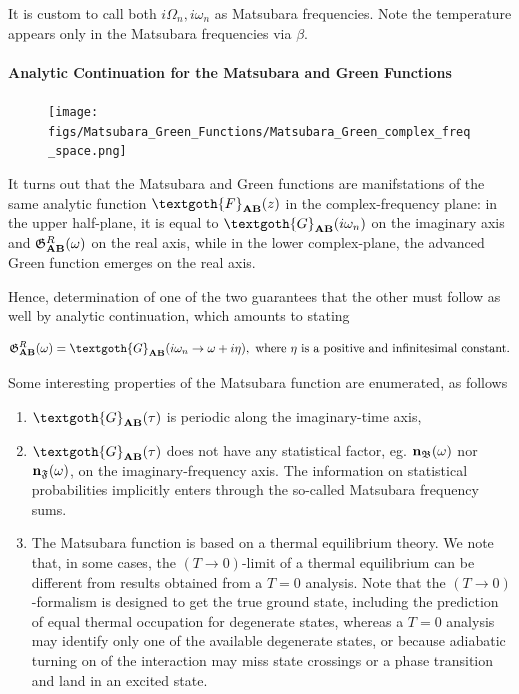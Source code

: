 It is custom to call both $i\Omega_n, i\omega_n$ as Matsubara frequencies. Note the temperature appears only in the Matsubara frequencies via $\beta$. \\

\paragraph{Analytic Continuation for the Matsubara and Green Functions}

\begin{figure}
\texttt{[image: figs/Matsubara\_Green\_Functions/Matsubara\_Green\_complex\_freq\_space.png]}
\end{figure} 

It turns out that the Matsubara and Green functions are manifstations of the same analytic function $\textgoth{F}_{{\bf AB}}(z)$ in the complex-frequency plane: in the upper half-plane, it is equal to ${\textgoth{G}_{{\bf AB}}}(i\omega_n)$ on the imaginary axis and $\mathfrak{G}^{R}_{{\bf AB}}(\omega)$ on the real axis, while in the lower complex-plane, the advanced Green function emerges on the real axis. 

Hence, determination of one of the two guarantees that the other must follow as well by analytic continuation, which amounts to stating 

\begin{equation}
    \mathfrak{G}_{{\bf AB}}^R(\omega) = \textgoth{G}_{{\bf AB}}(i\omega_n \rightarrow \omega + i \eta), \textnormal{ where $\eta$ is a positive and infinitesimal constant}.
\end{equation}

Some interesting properties of the Matsubara function are enumerated, as follows 

\begin{enumerate}
    \item $\textgoth{G}_{{\bf AB}}(\tau)$ is periodic along the imaginary-time axis,
    \item $\textgoth{G}_{{\bf AB}}(\tau)$ does not have any statistical factor, eg. ${\bf n}_{\mathfrak{B}}(\omega)$ nor ${\bf n}_{\mathfrak{F}}(\omega)$, on the imaginary-frequency axis. The information on statistical probabilities implicitly enters through the so-called Matsubara frequency sums. 
    \item The Matsubara function is based on a thermal equilibrium theory. We note that, in some cases, the $(T \rightarrow 0)$-limit of a thermal equilibrium can be different from results obtained from a $T = 0$ analysis. Note that the $(T \rightarrow 0)$-formalism is designed to get the true ground state, including the prediction of equal thermal occupation for degenerate states, whereas a $T = 0$ analysis may identify only one of the available degenerate states, or because adiabatic turning on of the interaction may miss state crossings or a phase transition and land in an excited state. 
\end{enumerate}

